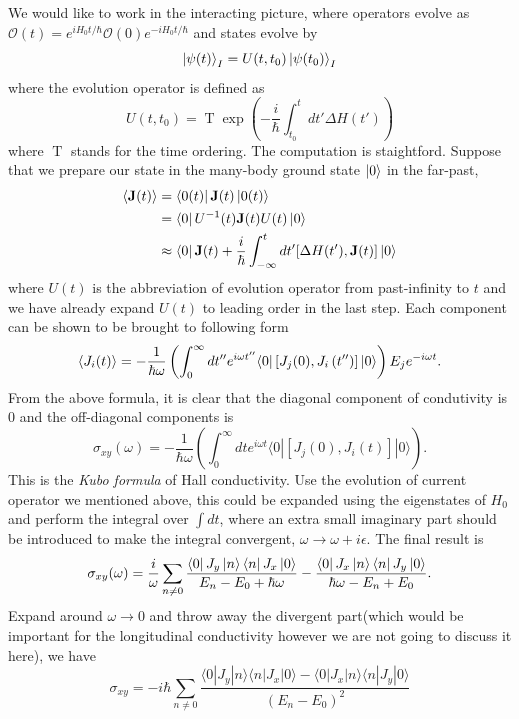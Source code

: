 \documentclass[12pt,a4paper]{article}
\numberwithin{equation}{section}
\begin{document}
We would like to work in the interacting picture, where operators evolve as $\mathcal{O}(t)=e^{iH_0t/\hbar}\mathcal{O}(0)e^{-iH_0t/\hbar}$ and states evolve by
\begin{equation}
    \ket{\psi(t)}_I = U(t,t_0)\ket{\psi(t_0)}_I
\end{equation}
where the evolution operator is defined as
\begin{equation}
    U(t,t_0) = \operatorname{T}\exp(-\frac{i}{\hbar}\int_{t_0}^tdt' \Delta H(t'))
\end{equation}
where $\operatorname{T}$ stands for the time ordering.
The computation is staightford. Suppose that we prepare our state in the many-body ground state $\ket{0}$ in the far-past,
\begin{equation}
    \begin{aligned}
        \expval{\mathbf{J}(t)} &= \bra{0(t)}\mathbf{J}(t)\ket{0(t)} \\ 
        & = \bra{0}U^{-1}(t)\mathbf{J}(t)U(t)\ket{0} \\
        & \approx \bra{0}\mathbf{J}(t) + \frac{i}{\hbar}\int_{-\infty}^{t}dt' [\Delta H(t'), \mathbf{J}(t)]\ket{0}
    \end{aligned}
\end{equation}
where $U(t)$ is the abbreviation of evolution operator from past-infinity to $t$ and we have already expand $U(t)$ to leading order in the last step.
Each component can be shown to be brought to following form
\begin{equation}
    \expval{J_i(t)}=-\frac{1}{\hbar \omega}\left(\int_0^{\infty} d t^{\prime \prime} e^{i \omega t^{\prime \prime}}\langle 0|\left[J_j(0), J_i\left(t^{\prime \prime}\right)\right]|0\rangle\right) E_j e^{-i \omega t}.
\end{equation}
From the above formula, it is clear that the diagonal component of condutivity is $0$ and the off-diagonal components is
\begin{equation}
    \sigma_{xy}(\omega) = -\frac{1}{\hbar \omega}\left(\int_0^{\infty} d t e^{i \omega t}\langle 0|\left[J_j(0), J_i\left(t\right)\right]|0\rangle\right).
\end{equation}
This is the \textit{Kubo formula} of Hall conductivity. Use the evolution of current operator we mentioned above, this could be expanded using the eigenstates of $H_0$ and perform the integral over $\int dt$, where
an extra small imaginary part should be introduced to make the integral convergent, $\omega \to \omega + i\epsilon$. The final result is
\begin{equation}
    \sigma_{xy}(\omega) = \frac{i}{\omega}\sum_{n\neq 0} \frac{\bra{0}J_y\ket{n}\bra{n}J_x\ket{0}}{E_n - E_0 + \hbar \omega } - \frac{\bra{0}J_x\ket{n}\bra{n}J_y\ket{0}}{\hbar \omega-E_n + E_0}.
\end{equation}
Expand around $\omega\to 0$ and throw away the divergent part(which would be important for the longitudinal conductivity however we are not going to discuss it here), we have
\begin{equation}
    \sigma_{x y}=-i \hbar \sum_{n \neq 0} \frac{\langle 0| J_y|n\rangle\langle n| J_x|0\rangle-\langle 0| J_x|n\rangle\langle n| J_y|0\rangle}{\left(E_n-E_0\right)^2}
\end{equation}
\end{document}
